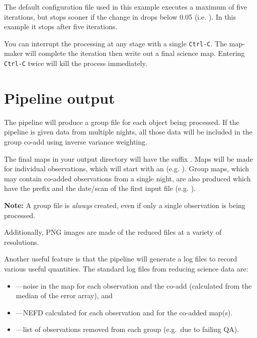 The default configuration file used in this example executes a maximum
of five iterations, but stops sooner if the change in 
drops below 0.05 (i.e. ). In this example it
stops after five iterations.



\begin{tip}
  You can interrupt the processing at any stage with a single
  \texttt{Ctrl-C}. The map-maker will complete the iteration then
  write out a final science map. Entering \texttt{Ctrl-C} twice will
  kill the process immediately.
\end{tip}

\section{Pipeline output}

The pipeline will produce a group file for each object being
processed. If the pipeline is given data from multiple nights, all
those data will be included in the group co-add using inverse variance
weighting.

The final maps in your output directory will have the suffix
. Maps will be made for individual observations, which
will start with an  (e.g.
). Group maps, which may
contain co-added observations from a single night, are also produced
which have the prefix  and the date/scan of the first input file
(e.g. ).

\textbf{Note:} A group file is \emph{always} created, even if only a
single observation is being processed.

Additionally, PNG images are made of the reduced files at a variety of
resolutions.

Another useful feature is that the pipeline will generate a log files
to record various useful quantities. The standard log files from
reducing science data are:

\begin{itemize}
\item {}---noise in the map for each observation and the co-add
(calculated from the median of the error array), and
\item {}---NEFD calculated for each observation and for
the co-added map(s).
\item {}---list of observations removed from each
  group (e.g.~due to failing QA).
\end{itemize}


